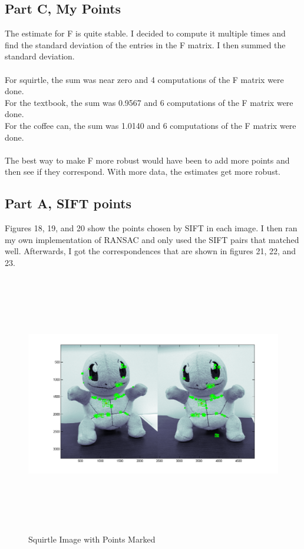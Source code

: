 \documentclass[11pt,psfig]{article}
\begin{document}
\newpage

\subsection*{Part C, My Points}

The estimate for F is quite stable. I decided to compute it multiple times and find the standard deviation of the entries in the F matrix. I then summed the standard deviation. \\
\\
For squirtle, the sum was near zero and 4 computations of the F matrix were done.\\
For the textbook, the sum was 0.9567 and 6 computations of the F matrix were done.\\
For the coffee can, the sum was 1.0140 and 6 computations of the F matrix were done. \\
\\
The best way to make F more robust would have been to add more points and then see if they correspond. With more data, the estimates get more robust. 

\subsection*{Part A, SIFT points}

Figures 18, 19, and 20 show the points chosen by SIFT in each image. I then ran my own implementation of RANSAC and only used the SIFT pairs that matched well. Afterwards, I got the correspondences that are shown in figures 21, 22, and 23.

\begin{figure}[H]
\centering
\includegraphics[height=4.5in]{squirtle_prob2Points2.png}
\caption{Squirtle Image with Points Marked}
\label{p2a}
\end{figure}
\end{document}
